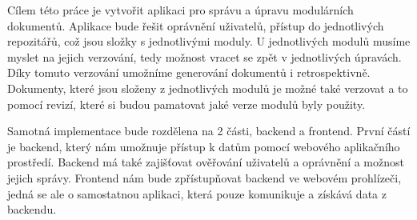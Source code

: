 Cílem této práce je vytvořit aplikaci pro správu a úpravu modulárních dokumentů. Aplikace bude řešit oprávnění uživatelů, přístup do
jednotlivých repozitářů, což jsou složky s jednotlivými moduly. U jednotlivých modulů musíme myslet na jejich verzování, tedy možnost
vracet se zpět v jednotlivých úpravách. Díky tomuto verzování umožníme generování dokumentů i retrospektivně. Dokumenty, které jsou
složeny z jednotlivých modulů je možné také verzovat a to pomocí revizí, které si budou pamatovat jaké verze modulů byly použity.

Samotná implementace bude rozdělena na 2 části, backend a frontend. První částí je backend, který nám umožnuje přístup k datům pomocí webového aplikačního
prostředí. Backend má také zajišťovat ověřování uživatelů a oprávnění a možnost jejich správy. Frontend nám bude zpřístupňovat backend
ve webovém prohlízeči, jedná se ale o samostatnou aplikaci, která pouze komunikuje a získává data z backendu.